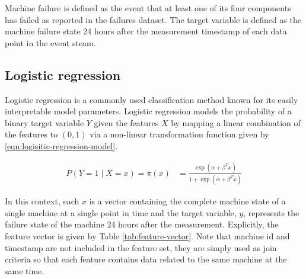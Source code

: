 \documentclass{article}
\begin{document}
Machine failure is defined as the event that at least one of its four components has failed as reported in the failures dataset. The target variable is defined as the machine failure state 24 hours after the measurement timestamp of each data point in the event steam. 

\subsection{Logistic regression}

Logistic regression is a commonly used classification method known for its easily interpretable model parameters. \cite{Agresti2003}\cite{Shalizi2012} Logistic regression models the probability of a binary target variable $Y$ given the features $X$ by mapping a linear combination of the features to $(0, 1)$ via a non-linear transformation function given by \eqref{eqn:logisitic-regression-model}.

\begin{align}
	P(Y=1 \mid X=x) = \pi(x) &= \frac{\exp(\alpha + \beta^Tx)}{1+\exp(\alpha + \beta^Tx)} \label{eqn:logisitic-regression-model}
\end{align}

In this context, each $x$ is a vector containing the complete machine state of a single machine at a single point in time and the target variable, $y$, represents the failure state of the machine 24 hours after the measurement. Explicitly, the feature vector is given by Table \ref{tab:feature-vector}. Note that machine id and timestamp are not included in the feature set, they are simply used as join criteria so that each feature contains data related to the same machine at the same time. 
\end{document}
